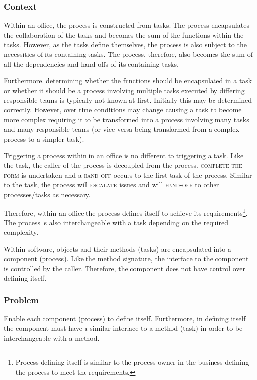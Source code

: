 \documentclass[prodmode]{style/acmlarge}
\begin{document}
\subsubsection*{Context} Within an office, the process is constructed from
tasks.  The process encapsulates the collaboration of the tasks and becomes the
sum of the functions within the tasks.  However, as the tasks define themselves,
the process is also subject to the necessities of its containing tasks.  The
process, therefore, also becomes the sum of all the dependencies and hand-offs
of its containing tasks.

Furthermore, determining whether the functions should be encapsulated in a task
or whether it should be a process involving multiple tasks executed by differing
responsible teams is typically not known at first.  Initially this may be
determined correctly.  However, over time conditions may change causing a
task to become more complex requiring it to be transformed into a process
involving many tasks and many responsible teams (or vice-versa being transformed
from a complex process to a simpler task).

Triggering a process within in an office is no different to triggering a task.
Like the task, the caller of the process is decoupled from the process.
\textsc{complete the form} is undertaken and a \textsc{hand-off} occurs to the
first task of the process.  Similar to the task, the process will
\textsc{escalate} issues and will \textsc{hand-off} to other processes/tasks as
necessary.

Therefore, within an office the process defines itself to achieve its
requirements\footnote{Process defining itself is similar to the process owner in
the business defining the process to meet the requirements.}.  The process is
also interchangeable with a task depending on the required complexity.

Within software, objects and their methods (tasks) are encapsulated into a
component (process).  Like the method signature, the interface to the component
is controlled by the caller.  Therefore, the component does not have control
over defining itself.

\subsubsection*{\textbf{Problem}} Enable each component (process) to define
itself.  Furthermore, in defining itself the component must have a similar
interface to a method (task) in order to be interchangeable with a method.
\end{document}
